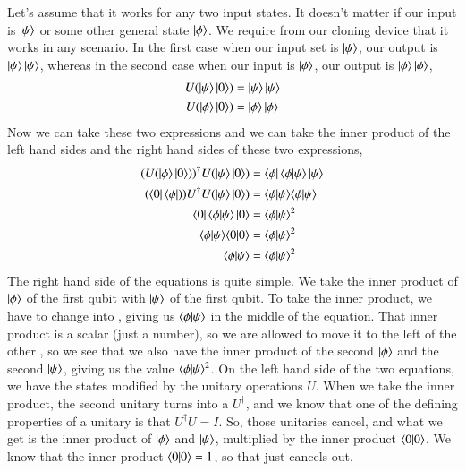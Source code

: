 Let's assume that it works for any two input states. It doesn't matter if our input is $\left| \psi \right\rangle$ or some other general state $\left| \phi \right\rangle$. We require from our cloning device that it works in any scenario. In the first case when our input set is $\left| \psi \right\rangle$, our output is $\left| \psi \right\rangle \left| \psi \right\rangle$, whereas in the second case when our input is $\left| \phi \right\rangle$, our output is $\left| \phi \right\rangle\left| \phi \right\rangle$,
\begin{equation}
\begin{aligned}
U(\left| \psi \right\rangle\left| 0 \right\rangle) &=\left| \psi \right\rangle\left| \psi \right\rangle \\
U(\left| \phi \right\rangle\left| 0 \right\rangle) &=\left| \phi \right\rangle\left| \phi \right\rangle
\end{aligned}
\end{equation}
Now we can take these two expressions and we can take the inner product of the left hand sides and the right hand sides of these two expressions,
\begin{equation}
\begin{aligned}
(U(\left| \phi \right\rangle\left| 0 \right\rangle))^{\dagger}U(\left| \psi \right\rangle\left| 0 \right\rangle) &= \left\langle \phi \right|\langle \phi|\psi \rangle\left| \psi \right\rangle \\
(\left\langle 0 \right|\left\langle \phi \right|))U^{\dagger}U(\left| \psi \right\rangle\left| 0 \right\rangle) &= \langle \phi|\psi \rangle\langle \phi|\psi \rangle \\
\left\langle 0 \right|\langle \phi|\psi \rangle\left| 0 \right\rangle &= \langle \phi|\psi \rangle^2\\
\langle \phi|\psi \rangle\langle 0|0 \rangle &= \langle \phi|\psi \rangle^2\\
\langle \phi|\psi \rangle &= \langle \phi|\psi \rangle^2
\end{aligned}
\end{equation}
The right hand side of the equations is quite simple. We take the inner product of $\left| \phi \right\rangle$ of the first qubit with $\left| \psi \right\rangle$ of the first qubit. To take the inner product, we have to change \ket{\phi} into \bra{\phi}, giving us $\langle \phi|\psi \rangle$ in the middle of the equation. That inner product is a scalar (just a number), so we are allowed to move it to the left of the other \ket{\phi}, so we see that we also have the inner product of the second $\left| \phi \right\rangle$ and the second $\left| \psi \right\rangle$, giving us the value $\langle \phi|\psi \rangle^2$. On the left hand side of the two equations, we have the states modified by the unitary operations $U$.  When we take the inner product, the second unitary turns into a $U^\dagger$, and we know that one of the defining properties of a unitary is that $U^\dagger U = I$. So, those unitaries cancel, and what we get is the inner product of $\left| \phi \right\rangle$ and $\left| \psi \right\rangle$, multiplied by the inner product $\langle 0|0 \rangle$. We know that the inner product $\langle 0|0 \rangle = 1$, so that just cancels out.

